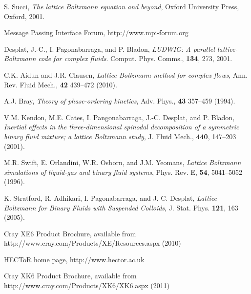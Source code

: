 \begin{thebibliography}{1}




S. Succi, \textit{The lattice Boltzmann equation and beyond},
Oxford University Press, Oxford, 2001.

Message Passing Interface Forum, http://www.mpi-forum.org 

Desplat, J.-C., I. Pagonabarraga, and P. Bladon,
\textit{LUDWIG: A parallel lattice-Boltzmann code for complex fluids}.
Comput. Phys. Comms., \textbf{134}, 273, 2001.

C.K. Aidun and J.R. Clausen,
\textit{Lattice Botlzmann method for complex flows},
Ann. Rev. Fluid Mech., \textbf{42} 439--472 (2010).

A.J. Bray,
\textit{Theory of phase-ordering kinetics},
Adv. Phys., \textbf{43} 357--459 (1994).

V.M. Kendon, M.E. Cates, I. Pangonabarraga, J.-C. Desplat, and P. Bladon,
\textit{Inertial effects in the three-dimensional spinodal decomposition of a
symmetric binary fluid mixture; a lattice Boltzmann study},
J. Fluid Mech., \textbf{440}, 147--203 (2001).

M.R. Swift, E. Orlandini, W.R. Osborn, and J.M. Yeomans,
\textit{Lattice Boltzmann simulations of liquid-gas and binary
fluid systems},
Phys. Rev. E, \textbf{54}, 5041--5052 (1996).


K. Stratford, R. Adhikari, I. Pagonabarraga, and J.-C. Desplat,
\textit{Lattice Boltzmann for Binary Fluids with Suspended Colloids},
J. Stat. Phys. \textbf{121}, 163 (2005).

Cray XE6 Product Brochure, available from http://www.cray.com/Products/XE/Resources.aspx (2010)

 HECToR home page, http://www.hector.ac.uk

Cray XK6 Product Brochure, available from http://www.cray.com/Products/XK6/XK6.aspx (2011)




\end{thebibliography}
